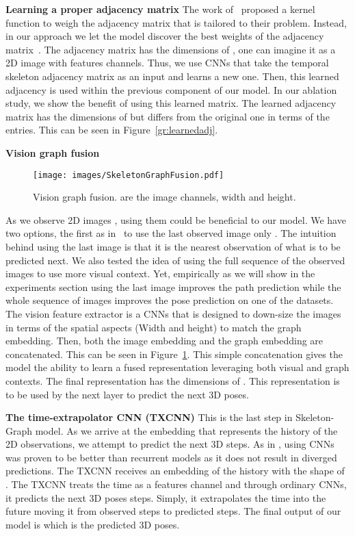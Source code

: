 \documentclass[10pt,twocolumn,letterpaper]{article}
\newcommand*{\ours}{Skeleton-Graph }
\begin{document}
\textbf{Learning a proper adjacency matrix}
The work of~\cite{mohamed2020social} proposed a kernel function to weigh the adjacency matrix that is tailored to their problem. Instead, in our approach we let the model discover the best weights of the adjacency matrix~\cite{wei2019motion}. The adjacency matrix  has the dimensions of , one can imagine it as a 2D image with  features channels. Thus, we use CNNs that take the temporal skeleton adjacency matrix as an input and learns a new one. Then, this learned adjacency  is used within the previous component of our model. In our ablation study, we show the benefit of using this learned matrix. The learned adjacency matrix  has the dimensions of  but differs from the original one  in terms of the entries. This can be seen in Figure~\ref{gr:learnedadj}.

\textbf{Vision graph fusion}
\begin{figure}[t]
\begin{center}
\texttt{[image: images/SkeletonGraphFusion.pdf]}
\end{center}
   \caption{Vision graph fusion.  are the image channels, width and height. }
\label{gr:fusion}
\end{figure}
As we observe 2D images , using them could be beneficial to our model. We have two options, the first as in~\cite{cao2020long} to use the last observed image only . The intuition behind using the last image is that it is the nearest observation of what is to be predicted next. We also tested the idea of using the full sequence of the observed images  to use more visual context. Yet, empirically as we will show in the experiments section using the last image improves the path prediction while the whole sequence of images improves the pose prediction on one of the datasets. The vision feature extractor is a CNNs that is designed to down-size the images in terms of the spatial aspects (Width and height) to match the graph embedding. Then, both the image embedding and the graph embedding are concatenated. This can be seen in Figure~\ref{gr:fusion}. This simple concatenation gives the model the ability to learn a fused representation leveraging both visual and graph contexts. The final representation has the dimensions of . This representation is to be used by the next layer to predict the next  3D poses.

\textbf{The time-extrapolator CNN (TXCNN)}
This is the last step in \ours model. As we arrive at the embedding that represents the history of the 2D observations, we attempt to predict the next  3D steps. As in \cite{mohamed2020social,bai2018empirical,malla2020social,wang2021graphtcn,zhao2020noticing}, using CNNs was proven to be better than recurrent models as it does not result in diverged predictions. The TXCNN receives an embedding of the history with the shape of . The TXCNN treats the time as a features channel and through ordinary CNNs, it predicts the next  3D poses  steps. Simply, it extrapolates the time into the future moving it from  observed steps to  predicted steps. The final output of our model is  which is the predicted 3D poses.
\end{document}
